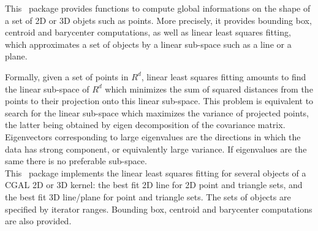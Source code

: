 This \cgal\ package provides functions to compute global informations
on the shape of a set of 2D or 3D objets such as points.
More precisely, it provides bounding box, centroid and barycenter computations,
as well as linear least squares fitting, which approximates a set
of objects by a linear sub-space such as a line or a plane.

Formally, given a set of points in $R^d$, linear least squares fitting amounts
to find the linear sub-space of $R^d$ which minimizes the sum of squared
distances from the points to their projection onto this linear sub-space. This
problem is equivalent to search for the linear sub-space which maximizes the
variance of projected points, the latter being obtained by eigen decomposition
of the covariance matrix. Eigenvectors corresponding to large eigenvalues are
the directions in which the data has strong component, or equivalently large
variance. If eigenvalues are the same there is no preferable sub-space.\\

This \cgal\ package implements the linear least squares fitting for
several objects of a CGAL 2D or 3D kernel: the best fit 2D line for 2D
point and triangle sets, and the best fit 3D line/plane for point and
triangle sets.  The sets of objects are specified by iterator ranges.
Bounding box, centroid and barycenter computations are also provided.

